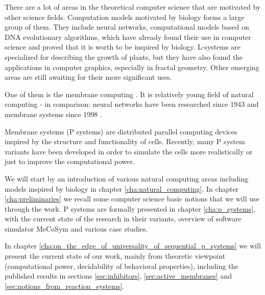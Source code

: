 
There are a lot of areas in the theoretical computer science that are motivated by other science fields. Computation models motivated by biology forms a large group of them. They include neural networks, computational models based on DNA evolutionary algorithms, which have already found their use in computer science and proved that it is worth to be inspired by biology. L-systems are specialized for describing the growth of plants, but they have also found the applications in computer graphics, especially in fractal geometry. Other emerging areas are still awaiting for their more significant uses.

One of them is the membrane computing \cite{Paun10OxfordHandbookMembraneComputing}. It is relatively young field of natural computing - in comparison: neural networks have been researched since 1943 and membrane systems since 1998 \cite{Paun98}.

Membrane systems (P systems) are distributed parallel computing devices inspired by the structure and functionality of cells. Recently, many P system variants have been developed in order to simulate the cells more realistically or just to improve the computational power.

We will start by an introduction of various natural computing areas including models inspired by biology in chapter \ref{cha:natural_computing}. In chapter \ref{cha:preliminaries} we recall some computer science basic notions that we will use through the work. P systems are formally presented in chapter \ref{cha:p_systems}, with the current state of the research in their variants, overview of software simulator MeCoSym and various case studies.

In chapter \ref{cha:on_the_edge_of_universality_of_sequential_p_systems} we will present the current state of our work, mainly from theoretic viewpoint (computational power, decidability of behavioral properties), including the published results in sections \ref{sec:inhibitors}, \ref{sec:active_membranes} and \ref{sec:notions_from_reaction_systems}.
